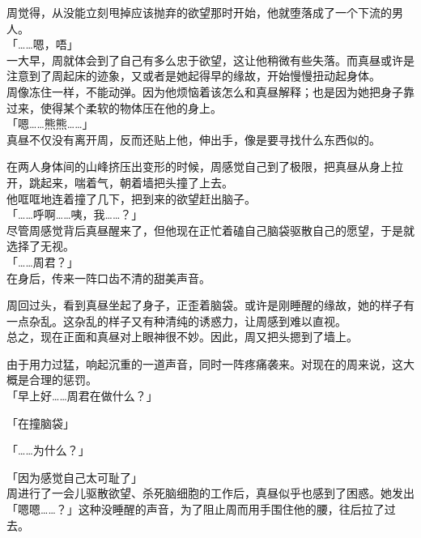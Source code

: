 周觉得，从没能立刻甩掉应该抛弃的欲望那时开始，他就堕落成了一个下流的男人。\\

「……嗯，唔」\\

一大早，周就体会到了自己有多么忠于欲望，这让他稍微有些失落。而真昼或许是注意到了周起床的迹象，又或者是她起得早的缘故，开始慢慢扭动起身体。\\

周像冻住一样，不能动弹。因为他烦恼着该怎么和真昼解释；也是因为她把身子靠过来，使得某个柔软的物体压在他的身上。\\

「嗯……熊熊……」\\

真昼不仅没有离开周，反而还贴上他，伸出手，像是要寻找什么东西似的。

在两人身体间的山峰挤压出变形的时候，周感觉自己到了极限，把真昼从身上拉开，跳起来，喘着气，朝着墙把头撞了上去。\\

他哐哐地连着撞了几下，把到来的欲望赶出脑子。\\

「……呼啊……咦，我……？」\\

尽管周感觉背后真昼醒来了，但他现在正忙着磕自己脑袋驱散自己的愿望，于是就选择了无视。\\

「……周君？」\\

在身后，传来一阵口齿不清的甜美声音。

周回过头，看到真昼坐起了身子，正歪着脑袋。或许是刚睡醒的缘故，她的样子有一点杂乱。这杂乱的样子又有种清纯的诱惑力，让周感到难以直视。\\

总之，现在正面和真昼对上眼神很不妙。因此，周又把头摁到了墙上。

由于用力过猛，响起沉重的一道声音，同时一阵疼痛袭来。对现在的周来说，这大概是合理的惩罚。\\

「早上好……周君在做什么？」

「在撞脑袋」

「……为什么？」

「因为感觉自己太可耻了」\\

周进行了一会儿驱散欲望、杀死脑细胞的工作后，真昼似乎也感到了困惑。她发出「嗯嗯……？」这种没睡醒的声音，为了阻止周而用手围住他的腰，往后拉了过去。

